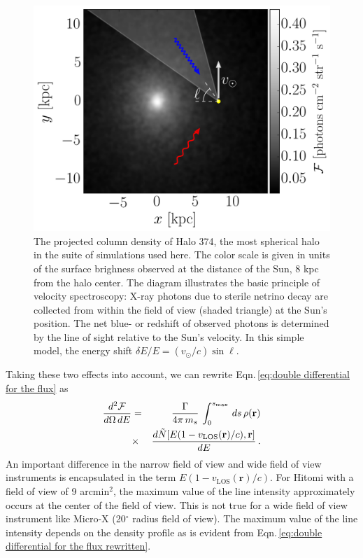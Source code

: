 \documentclass[aps,prd,10pt,twocolumn,superscriptaddress,showpacs]{revtex4-1}
\newcommand{\br}[0]{\mathbf{r}}
\newcommand{\los}[0]{\mathrm{LOS}}
\begin{document}
\begin{figure}[h!]
\centering
\includegraphics[width=0.99\columnwidth]{vspec_diagram.png}
\caption{The projected column density of Halo 374, the most spherical halo in the suite of
	simulations used here. The color scale is given in units of the surface brighness observed at
the distance of the Sun, 8 kpc from the halo center. The diagram illustrates the basic principle of velocity
spectroscopy: X-ray photons due to sterile netrino decay are collected from within the field
of view (shaded triangle) at the Sun's position. The net blue- or redshift of observed photons 
is determined by the line of sight relative to the Sun's velocity. In this simple model, the energy
shift $\delta E/E=(v_\odot/c)\sin\ell$.}
\label{fig:halo374}
\end{figure}

Taking these two effects into account, we can rewrite Eqn.\,\ref{eq:double differential for the flux} as 
\begin{eqnarray}
\dfrac{d^2 \mathcal{F}}{d\Omega \, dE} &=&  \dfrac{\Gamma}{4\pi \, m_s} \, \int _0 ^{s_{\rm
max}}  \, ds \, \rho(\br) \nonumber\\
&\times& \dfrac{d \tilde{N}[E(1 - v_\los(\br)/c), \br]}{dE} \,.
\label{eq:double differential for the flux rewritten}
\end{eqnarray}
An important difference in the narrow field of view and wide field of view instruments is
encapsulated in the term $E(1 - v_\los(\br)/c)$.  For Hitomi with a field of view of 9 arcmin$^2$, the maximum value of the line intensity approximately occurs at the center of the field of view.  This is not true for a wide field of view instrument like Micro-X (20$^\circ$ radius field of view).  The maximum value of the line intensity depends on the density profile as is evident from Eqn.\,\ref{eq:double differential for the flux rewritten}.  
\end{document}
